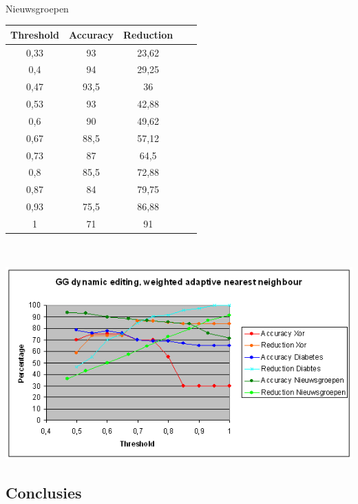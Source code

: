 \documentclass{article}
\begin{document}
\\
Nieuwsgroepen\\
\begin{tabular}{|c|c|c|c|c|}  \hline
Threshold	& Accuracy &	Reduction \\ \hline
0,33 &	93 &	23,62 \\
0,4 &	94 &	29,25 \\
0,47 &	93,5 &	36 \\
0,53 &	93 &	42,88 \\
0,6 &	90 &	49,62 \\
0,67 &	88,5 &	57,12 \\
0,73 &	87 &	64,5 \\
0,8 &	85,5 &	72,88 \\
0,87 &	84 &	79,75 \\
0,93 &	75,5 &	86,88 \\
1 &	71 &	91 \\ \hline
\end{tabular} \\

\begin{center} \includegraphics[scale=0.7]{GG_dynamic_adaptive} \end{center}

\subsection{Conclusies}
\end{document}
